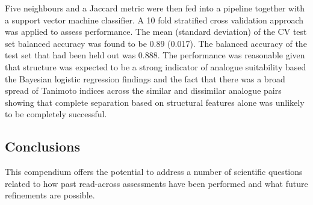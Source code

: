 \documentclass[
  super,
  preprint,
  3p]{elsarticle}
\begin{document}
\begin{figure}

\begin{minipage}{0.50\linewidth}



\end{minipage}%
%
\begin{minipage}{0.50\linewidth}



\end{minipage}%

\end{figure}%

Five neighbours and a Jaccard metric were then fed into a pipeline
together with a support vector machine classifier. A 10 fold stratified
cross validation approach was applied to assess performance. The mean
(standard deviation) of the CV test set balanced accuracy was found to
be 0.89 (0.017). The balanced accuracy of the test set that had been
held out was 0.888. The performance was reasonable given that structure
was expected to be a strong indicator of analogue suitability based the
Bayesian logistic regression findings and the fact that there was a
broad spread of Tanimoto indices across the similar and dissimilar
analogue pairs showing that complete separation based on structural
features alone was unlikely to be completely successful.

\subsection{Conclusions}\label{conclusions}

This compendium offers the potential to address a number of scientific
questions related to how past read-across assessments have been
performed and what future refinements are possible.


  
\end{document}
